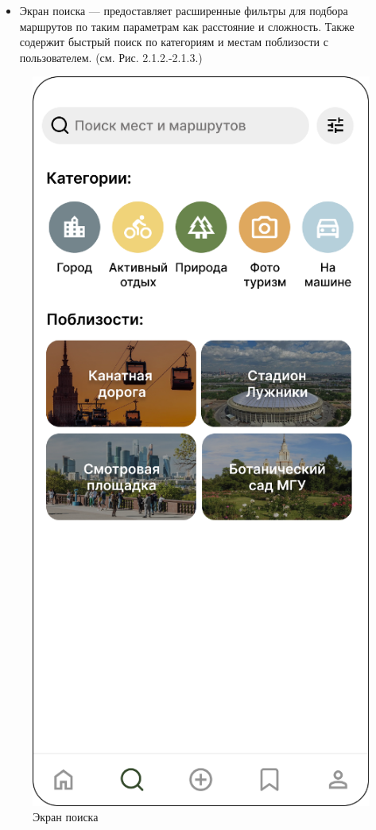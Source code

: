\begin{itemize}
    \item Экран поиска — предоставляет расширенные фильтры для подбора маршрутов по таким параметрам как расстояние и сложность. Также содержит быстрый поиск по категориям и местам поблизости с пользователем. (см. Рис. 2.1.2.-2.1.3.)
\end{itemize}
\begin{figure}[H]
        \centering
        \includegraphics[width=0.4\linewidth]{Images/ui/Picture2.png}
        \caption{Экран поиска}
        \label{fig:ui_screen_2}
\end{figure}

